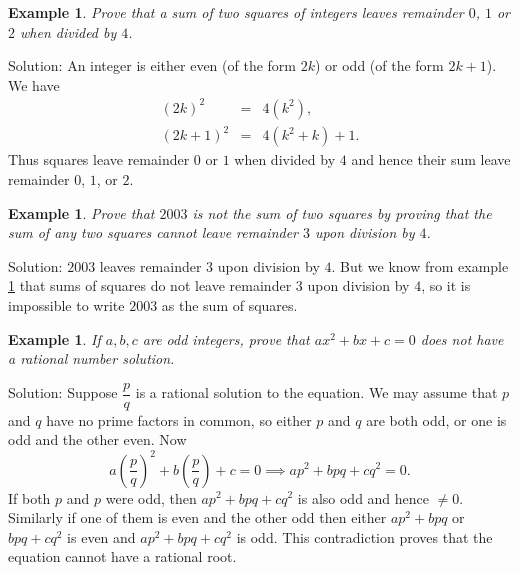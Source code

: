 \documentclass[11pt, openany]{book}
\theoremstyle{change} \theoremheaderfont{\blue\sffamily\bfseries}
\newtheorem{exa}[thm]{Example}
\theoremstyle{nonumberplain} \theoremheaderfont{\sffamily\bfseries}
\newcommand{\í}{\'{\i}}
\begin{document}
\begin{exa}\label{exa:squares_mod_4}
 Prove that a sum of two
squares of integers leaves remainder $0$, $1$ or $2$ when divided
by $4$.
\end{exa}
Solution: An integer is either even (of the form $2k$) or odd (of
the form $2k + 1$). We have
$$\begin{array}{lll}(2k)^2 & = & 4(k^2), \\
(2k + 1)^2 & = & 4(k^2 + k) + 1.
  \end{array}$$Thus squares leave remainder $0$ or $1$ when
  divided by $4$ and hence their sum leave remainder $0$, $1$, or
  $2$.

\begin{exa}
Prove that $2003$ is not the sum of two squares by proving that
the sum of any two squares cannot leave remainder $3$ upon
division by $4$.
\end{exa}Solution: $2003$ leaves remainder $3$ upon division by
$4$. But we know from example \ref{exa:squares_mod_4} that sums of
squares do not leave remainder $3$ upon division by $4$, so it is
impossible to write $2003$ as the sum of squares.
\begin{exa}
If $a, b, c$ are odd integers, prove that $ax^2 + bx + c = 0$ does
not have a rational number solution.
\end{exa}Solution: Suppose $\dfrac{p}{q}$ is a rational solution
to the equation. We may assume that $p$ and $q$ have no prime
factors in common, so either $p$ and $q$ are both odd, or one is
odd and the other even. Now
$$a\left(\dfrac{p}{q}\right)^2 + b\left(\dfrac{p}{q}\right) + c = 0 \implies ap^2 + bpq + cq^2 = 0.   $$
If both $p$ and $p$ were odd, then $ap^2 + bpq + cq^2 $ is also
odd and hence $\neq 0$. Similarly if one of them is even and the
other odd then either $ap^2 + bpq$ or $bpq + cq^2 $ is even and
$ap^2 + bpq + cq^2 $ is odd. This contradiction proves that the
equation cannot have a rational root.
\end{document}
